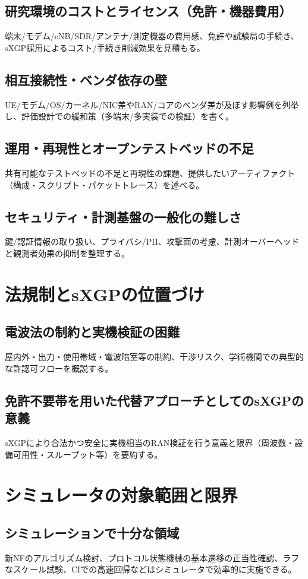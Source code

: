 \subsection{研究環境のコストとライセンス（免許・機器費用）}
端末/モデム/eNB/SDR/アンテナ/測定機器の費用感、免許や試験局の手続き、sXGP採用によるコスト/手続き削減効果を見積もる。
\subsection{相互接続性・ベンダ依存の壁}
UE/モデム/OS/カーネル/NIC差やRAN/コアのベンダ差が及ぼす影響例を列挙し、評価設計での緩和策（多端末/多実装での検証）を書く。
\subsection{運用・再現性とオープンテストベッドの不足}
共有可能なテストベッドの不足と再現性の課題、提供したいアーティファクト（構成・スクリプト・パケットトレース）を述べる。
\subsection{セキュリティ・計測基盤の一般化の難しさ}
鍵/認証情報の取り扱い、プライバシ/PII、攻撃面の考慮、計測オーバーヘッドと観測者効果の抑制を整理する。

\section{法規制とsXGPの位置づけ}
\subsection{電波法の制約と実機検証の困難}
屋内外・出力・使用帯域・電波暗室等の制約、干渉リスク、学術機関での典型的な許認可フローを概説する。
\subsection{免許不要帯を用いた代替アプローチとしてのsXGPの意義}
sXGPにより合法かつ安全に実機相当のRAN検証を行う意義と限界（周波数・設備可用性・スループット等）を要約する。

\section{シミュレータの対象範囲と限界}
\subsection{シミュレーションで十分な領域}
新NFのアルゴリズム検討、プロトコル状態機械の基本遷移の正当性確認、ラフなスケール試験、CIでの高速回帰などはシミュレータで効率的に実施できる。
